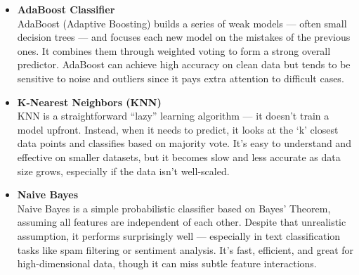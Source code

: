 \begin{itemize}

    \item \textbf{AdaBoost Classifier}\\
    AdaBoost (Adaptive Boosting) builds a series of weak models — often small decision trees — and focuses each new model on the mistakes of the previous ones.
    It combines them through weighted voting to form a strong overall predictor.
    AdaBoost can achieve high accuracy on clean data but tends to be sensitive to noise and outliers since it pays extra attention to difficult cases.


    \item \textbf{K-Nearest Neighbors (KNN)}\\
    KNN is a straightforward “lazy” learning algorithm — it doesn’t train a model upfront.
    Instead, when it needs to predict, it looks at the ‘k’ closest data points and classifies based on majority vote.
    It’s easy to understand and effective on smaller datasets, but it becomes slow and less accurate as data size grows, especially if the data isn’t well-scaled.


    \item \textbf{Naive Bayes}\\
    Naive Bayes is a simple probabilistic classifier based on Bayes’ Theorem, assuming all features are independent of each other.
    Despite that unrealistic assumption, it performs surprisingly well — especially in text classification tasks like spam filtering or sentiment analysis.
    It’s fast, efficient, and great for high-dimensional data, though it can miss subtle feature interactions.



\end{itemize}
